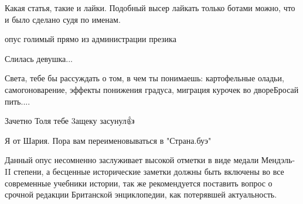 \begin{itemize}
Какая статья, такие и лайки. Подобный высер лайкать только ботами можно, что и было сделано судя по именам.

 
опус голимый прямо из администрации презика

 
Слилась девушка...

 
Света, тебе бы рассуждать о том, в чем ты понимаешь: картофельные оладьи, самогоноварение, эффекты понижения градуса, миграция курочек во дворе\Laughey[1.0][white] Бросай пить....

 
Зачетно Толя тебе 3ащеку засунул👍


Я от Шария. Пора вам переименовываться в
"Страна.буэ"

 
Данный опус несомненно заслуживает высокой отметки в виде медали Мендэль- II
степени, а бесценные исторические заметки должны быть включены во все
современные учебники истории, так же рекомендуется поставить вопрос о срочной
редакции Британской энциклопедии, как потерявшей актуальность.

 

\end{itemize}
